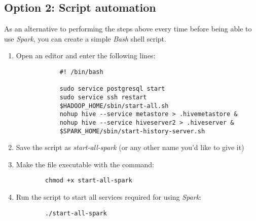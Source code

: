 \documentclass{article}
\begin{document}
    \subsection{Option 2: Script automation}
    As an alternative to performing the steps above every time before being able to use \emph{Spark},
    you can create a simple \emph{Bash} shell script.
    \begin{enumerate}
    \item Open an editor and enter the following lines:
        \begin{verbatim}
            #! /bin/bash

            sudo service postgresql start
            sudo service ssh restart
            $HADOOP_HOME/sbin/start-all.sh
            nohup hive --service metastore > .hivemetastore &
            nohup hive --service hiveserver2 > .hiveserver &
            $SPARK_HOME/sbin/start-history-server.sh  
        \end{verbatim}
    
    \item Save the script as \emph{start-all-spark} (or any other name you'd like to give it)

    \item Make the file executable with the command:
    \begin{verbatim}
        chmod +x start-all-spark
    \end{verbatim}

    \item Run the script to start all services required for using \emph{Spark}:
    \begin{verbatim}
        ./start-all-spark
    \end{verbatim}
\end{enumerate}
\end{document}
